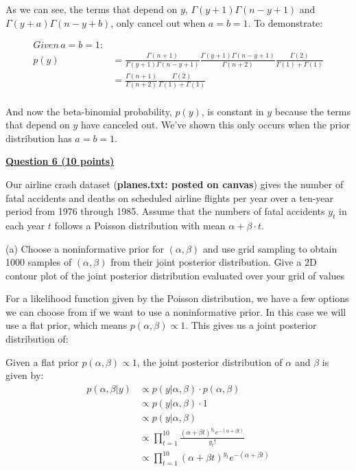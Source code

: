 \documentclass[12pt]{article}
\begin{document}
As we can see, the terms that depend on $y$, $\Gamma(y+1)\Gamma(n-y+1)$ and $\Gamma(y + a)\Gamma(n - y + b)$, only cancel out
when $a = b = 1$. To demonstrate:

\begin{align*}
Given \, a = b = 1: \\
p(y) &= \frac{\Gamma(n+1)}{\Gamma(y+1)\Gamma(n-y+1)}\frac{\Gamma(y + 1)\Gamma(n - y + 1)}{\Gamma(n + 2)}\frac{\Gamma(2)}{\Gamma(1) + \Gamma(1)} \\
&= \frac{\Gamma(n+1)}{\Gamma(n+2)}\frac{\Gamma(2)}{\Gamma(1) + \Gamma(1)} \\
\end{align*}

And now the beta-binomial probability, $p(y)$, is constant in $y$ because the terms that depend on $y$ have
canceled out. We've shown this only occurs when the prior distribution has $a = b = 1$.

\bigskip


{\underline{\bf Question 6 (10 points)}}  

Our airline crash dataset ({\bf planes.txt: posted on canvas}) gives the number of fatal accidents and deaths on scheduled airline flights per year over a ten-year period from 1976 through 1985.  Assume that the numbers of fatal accidents $y_t$ in each year $t$ follows a Poisson distribution with mean $\alpha + \beta \cdot t$. 

(a) Choose a noninformative prior for $(\alpha, \beta)$ and use grid sampling to obtain 1000 samples of $(\alpha, \beta)$ from their joint posterior distribution.  Give a 2D contour plot of the joint posterior distribution evaluated over your grid of values

For a likelihood function given by the Poisson distribution, we have a few options we can choose from if we want
to use a noninformative prior. In this case we will use a flat prior, which means $p(\alpha, \beta) \propto 1$.
This gives us a joint posterior distribution of:

Given a flat prior $p(\alpha, \beta) \propto 1$, the joint posterior distribution of $\alpha$ and $\beta$ is given by:
\begin{align*}
p(\alpha, \beta | y) &\propto p(y | \alpha, \beta) \cdot p(\alpha, \beta) \\
&\propto p(y | \alpha, \beta) \cdot 1 \\
&\propto p(y | \alpha, \beta) \\
&\propto \prod_{t=1}^{10} \frac{(\alpha + \beta t)^{y_t}e^{-(\alpha + \beta t)}}{y_t!} \\
&\propto \prod_{t=1}^{10} (\alpha + \beta t)^{y_t}e^{-(\alpha + \beta t)} \\
\end{align*}
\end{document}
